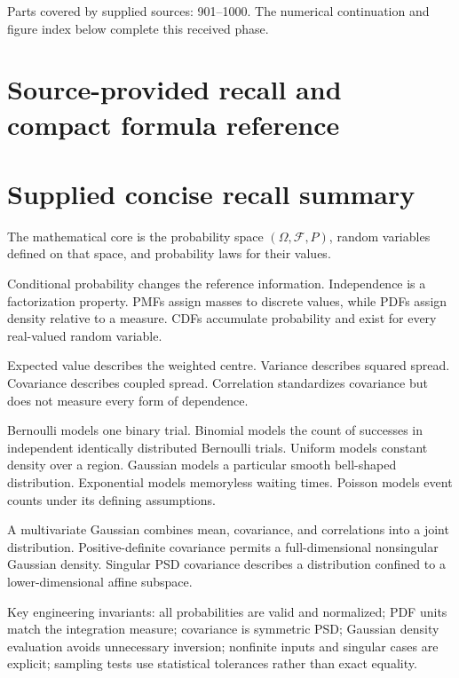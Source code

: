Parts covered by supplied sources: 901--1000. The numerical continuation and figure index below complete this received phase.

\section{Source-provided recall and compact formula reference}\label{appendix-cb5af353ef77-source-provided-recall-and-compact-formula-reference}

\section{Supplied concise recall summary}\label{appendix-cb5af353ef77-supplied-concise-recall-summary}

The mathematical core is the probability space \((\Omega,\mathcal F,P)\), random variables defined on that space, and probability laws for their values.

Conditional probability changes the reference information. Independence is a factorization property. PMFs assign masses to discrete values, while PDFs assign density relative to a measure. CDFs accumulate probability and exist for every real-valued random variable.

Expected value describes the weighted centre. Variance describes squared spread. Covariance describes coupled spread. Correlation standardizes covariance but does not measure every form of dependence.

Bernoulli models one binary trial. Binomial models the count of successes in independent identically distributed Bernoulli trials. Uniform models constant density over a region. Gaussian models a particular smooth bell-shaped distribution. Exponential models memoryless waiting times. Poisson models event counts under its defining assumptions.

A multivariate Gaussian combines mean, covariance, and correlations into a joint distribution. Positive-definite covariance permits a full-dimensional nonsingular Gaussian density. Singular PSD covariance describes a distribution confined to a lower-dimensional affine subspace.

Key engineering invariants: all probabilities are valid and normalized; PDF units match the integration measure; covariance is symmetric PSD; Gaussian density evaluation avoids unnecessary inversion; nonfinite inputs and singular cases are explicit; sampling tests use statistical tolerances rather than exact equality.


